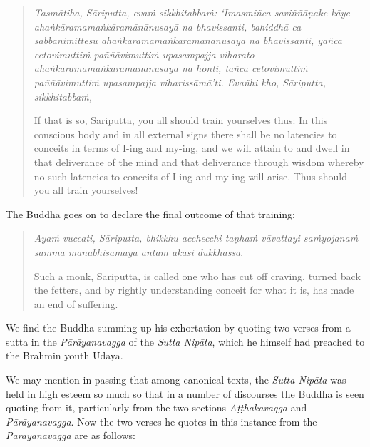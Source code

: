 \begin{quote}
\emph{Tasmātiha, Sāriputta, evaṁ sikkhitabbaṁ: `Imasmiñca saviññāṇake kāye ahaṅkāramamaṅkāramānānusayā na bhavissanti, bahiddhā ca sabbanimittesu ahaṅkāramamaṅkāramānānusayā na bhavissanti, yañca cetovimuttiṁ paññāvimuttiṁ upasampajja viharato ahaṅkāramamaṅkāramānānusayā na honti, tañca cetovimuttiṁ paññāvimuttiṁ upasampajja viharissāmā'ti. Evañhi kho, Sāriputta, sikkhitabbaṁ,}

If that is so, Sāriputta, you all should train yourselves thus: In this conscious body and in all external signs there shall be no latencies to conceits in terms of I-ing and my-ing, and we will attain to and dwell in that deliverance of the mind and that deliverance through wisdom whereby no such latencies to conceits of I-ing and my-ing will arise. Thus should you all train yourselves!
\end{quote}

The Buddha goes on to declare the final outcome of that training:

\begin{quote}
\emph{Ayaṁ vuccati, Sāriputta, bhikkhu acchecchi taṇhaṁ vāvattayi saṁyojanaṁ sammā mānābhisamayā antam akāsi dukkhassa}.

Such a monk, Sāriputta, is called one who has cut off craving, turned back the fetters, and by rightly understanding conceit for what it is, has made an end of suffering.
\end{quote}

We find the Buddha summing up his exhortation by quoting two verses from a sutta in the \emph{Pārāyanavagga} of the \emph{Sutta Nipāta}, which he himself had preached to the Brahmin youth Udaya.

We may mention in passing that among canonical texts, the \emph{Sutta Nipāta} was held in high esteem so much so that in a number of discourses the Buddha is seen quoting from it, particularly from the two sections \emph{Aṭṭhakavagga} and \emph{Pārāyanavagga}. Now the two verses he quotes in this instance from the \emph{Pārāyanavagga} are as follows:

